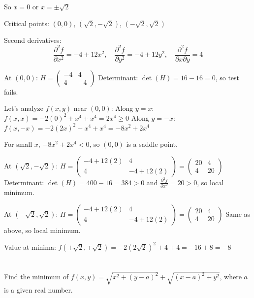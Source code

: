 \documentclass[12pt]{article}
\begin{document}
\begin{correctionbox}
So $x = 0$ or $x = \pm \sqrt{2}$

Critical points: $(0, 0)$, $(\sqrt{2}, -\sqrt{2})$, $(-\sqrt{2}, \sqrt{2})$

Second derivatives:
$$\frac{\partial^2 f}{\partial x^2} = -4 + 12x^2, \quad \frac{\partial^2 f}{\partial y^2} = -4 + 12y^2, \quad \frac{\partial^2 f}{\partial x \partial y} = 4$$

At $(0, 0)$: $H = \begin{pmatrix} -4 & 4 \\ 4 & -4 \end{pmatrix}$
Determinant: $\det(H) = 16 - 16 = 0$, so test fails.

Let's analyze $f(x, y)$ near $(0,0)$:
Along $y = x$: $f(x, x) = -2(0)^2 + x^4 + x^4 = 2x^4 \geq 0$
Along $y = -x$: $f(x, -x) = -2(2x)^2 + x^4 + x^4 = -8x^2 + 2x^4$

For small $x$, $-8x^2 + 2x^4 < 0$, so $(0,0)$ is a saddle point.

At $(\sqrt{2}, -\sqrt{2})$: $H = \begin{pmatrix} -4 + 12(2) & 4 \\ 4 & -4 + 12(2) \end{pmatrix} = \begin{pmatrix} 20 & 4 \\ 4 & 20 \end{pmatrix}$
Determinant: $\det(H) = 400 - 16 = 384 > 0$ and $\frac{\partial^2 f}{\partial x^2} = 20 > 0$, so local minimum.

At $(-\sqrt{2}, \sqrt{2})$: $H = \begin{pmatrix} -4 + 12(2) & 4 \\ 4 & -4 + 12(2) \end{pmatrix} = \begin{pmatrix} 20 & 4 \\ 4 & 20 \end{pmatrix}$
Same as above, so local minimum.

Value at minima: $f(\pm\sqrt{2}, \mp\sqrt{2}) = -2(2\sqrt{2})^2 + 4 + 4 = -16 + 8 = -8$
\end{correctionbox}

\section{}
Find the minimum of $f(x, y) = \sqrt{x^2 + (y - a)^2} + \sqrt{(x - a)^2 + y^2}$, where $a$ is a given real number.
\end{document}
